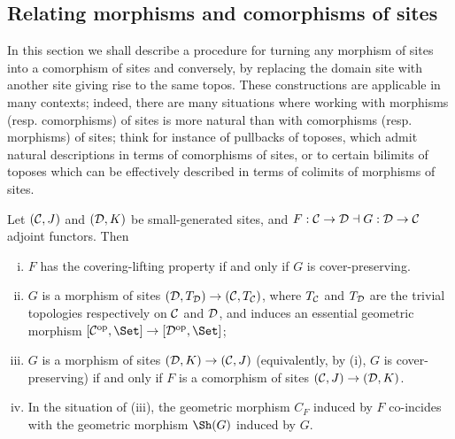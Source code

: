 \documentclass[a4paper,12pt]{article}
\begin{document}
\subsection{Relating morphisms and comorphisms of sites}

In this section we shall describe a procedure for turning any morphism of sites into a comorphism of sites and conversely, by replacing the domain site with another site giving rise to the same topos. These constructions are applicable in many contexts; indeed, there are many situations where working with morphisms (resp. comorphisms) of sites is more natural than with comorphisms (resp. morphisms) of sites; think for instance of pullbacks of toposes, which admit natural descriptions in terms of comorphisms of sites, or to certain bilimits of toposes which can be effectively described in terms of colimits of morphisms of sites.  

\begin{proposition}\label{propadjointinduction}
	Let $({\cal C}, J)$ and $({\cal D}, K)$ be small-generated sites, and $F:{\cal C}\to {\cal D}\dashv G:{\cal D}\to {\cal C}$ adjoint functors. Then
	\begin{enumerate}[(i)]
		\item $F$ has the covering-lifting property if and only if $G$ is cover-preserving.
		
		\item $G$ is a morphism of sites $({\cal D}, T_{\cal D})\to ({\cal C}, T_{\cal C})$, where $T_{\cal C}$ and $T_{\cal D}$ are the trivial topologies respectively on $\cal C$ and $\cal D$, and induces an essential geometric morphism $[{\cal C}^{\textup{op}}, \Set]\to [{\cal D}^{\textup{op}}, \Set]$;
		
		\item $G$ is a morphism of sites $({\cal D}, K) \to ({\cal C}, J)$ (equivalently, by (i), $G$ is cover-preserving) if and only if $F$ is a comorphism of sites $({\cal C}, J)\to ({\cal D}, K)$.
		
		\item In the situation of (iii), the geometric morphism $C_{F}$ induced by $F$ co-incides with the geometric morphism $\Sh(G)$ induced by $G$.
	\end{enumerate}
\end{proposition}
\end{document}
